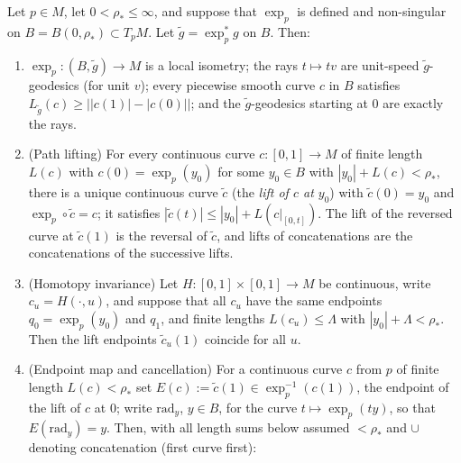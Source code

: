 \begin{lemma}
Let $p\in M$, let $0<\rho_*\le\infty$, and suppose that
$\exp_p$ is defined and non-singular on
$B=B(0,\rho_*)\subset T_pM$. Let $\tilde g=\exp_p^*g$ on $B$.
Then:
\begin{enumerate}
\item $\exp_p\colon (B,\tilde g)\to M$ is a local isometry; the
rays $t\mapsto tv$ are unit-speed $\tilde g$-geodesics (for unit
$v$); every piecewise smooth curve $c$ in $B$ satisfies
$L_{\tilde g}(c)\ge\bigl||c(1)|-|c(0)|\bigr|$; and the
$\tilde g$-geodesics starting at $0$ are exactly the rays.
\item (Path lifting) For every continuous curve $c\colon[0,1]\to M$
of finite length $L(c)$ with $c(0)=\exp_p(y_0)$ for some
$y_0\in B$ with $|y_0|+L(c)<\rho_*$, there is a unique continuous
curve $\tilde c$ (the \emph{lift of $c$ at $y_0$}) with $\tilde
c(0)=y_0$ and $\exp_p\circ\tilde c=c$; it satisfies $|\tilde
c(t)|\le|y_0|+L(c|_{[0,t]})$. The lift of the reversed curve at
$\tilde c(1)$ is the reversal of $\tilde c$, and lifts of
concatenations are the concatenations of the successive lifts.
\item (Homotopy invariance) Let $H\colon[0,1]\times[0,1]\to M$ be
continuous, write $c_u=H(\cdot,u)$, and suppose that all $c_u$ have
the same endpoints $q_0=\exp_p(y_0)$ and $q_1$, and finite
lengths $L(c_u)\le\Lambda$ with $|y_0|+\Lambda<\rho_*$. Then the
lift endpoints $\tilde c_u(1)$ coincide for all $u$.
\item (Endpoint map and cancellation) For a continuous curve $c$
from $p$ of finite length $L(c)<\rho_*$ set
$E(c):=\tilde c(1)\in\exp_p^{-1}(c(1))$, the endpoint of the
lift of $c$ at $0$; write $\mathrm{rad}_y$, $y\in B$, for the curve
$t\mapsto\exp_p(ty)$, so that $E(\mathrm{rad}_y)=y$. Then, with
all length sums below assumed $<\rho_*$ and $\cup$ denoting
concatenation (first curve first):
\end{enumerate}
\end{lemma}
